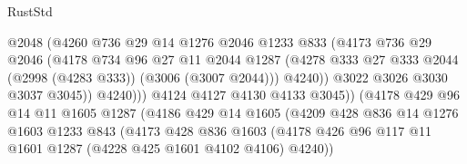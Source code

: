 \begin{lexlean}{RustStd}
\begin{coremodule}
                                @2048
                                (@4260
                                  @736
                                  @29
                                  @14
                                  @1276
                                  @2046
                                  @1233
                                  @833
                                  (@4173
                                    @736
                                    @29
                                    @2046
                                    (@4178
                                      @734
                                      @96
                                      @27
                                      @11
                                      @2044
                                      @1287
                                      (@4278
                                        @333
                                        @27
                                        @333
                                        @2044
                                        (@2998 (@4283 @333))
                                        (@3006 (@3007 @2044)))
                                      @4240))
                                  @3022
                                  @3026
                                  @3030
                                  @3037
                                  @3045))
                              @4240)))
                        @4124
                        @4127
                        @4130
                        @4133
                        @3045))
                    (@4178
                      @429
                      @96
                      @14
                      @11
                      @1605
                      @1287
                      (@4186
                        @429
                        @14
                        @1605
                        (@4209
                          @428
                          @836
                          @14
                          @1276
                          @1603
                          @1233
                          @843
                          (@4173
                            @428
                            @836
                            @1603
                            (@4178
                              @426
                              @96
                              @117
                              @11
                              @1601
                              @1287
                              (@4228 @425 @1601 @4102 @4106)
                              @4240))

\end{coremodule}
\end{lexlean}
